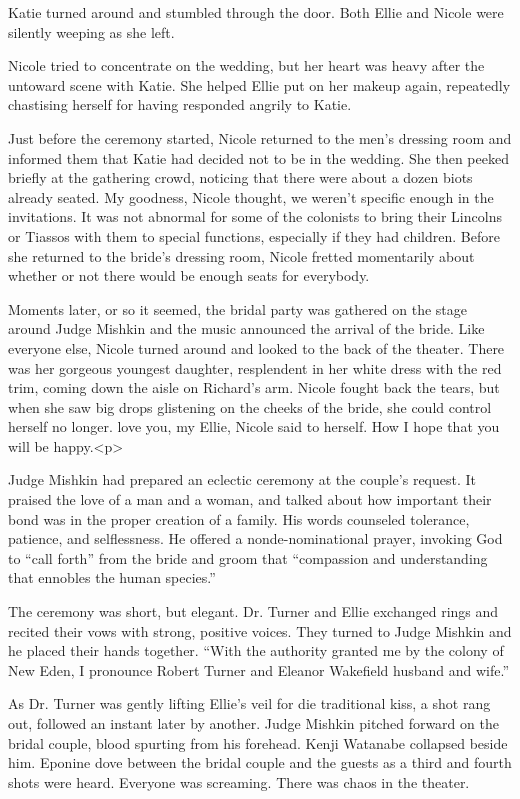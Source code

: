 \documentclass[]{article}
\begin{document}
{Katie turned around and stumbled through the door. Both Ellie and Nicole were silently weeping as she left.

Nicole tried to concentrate on the wedding, but her heart was heavy after the untoward scene with Katie. She helped Ellie put on her makeup again, repeatedly chastising herself for having responded angrily to Katie.

Just before the ceremony started, Nicole returned to the men’s dressing room and informed them that Katie had decided not to be in the wedding. She then peeked briefly at the gathering crowd, noticing that there were about a dozen biots already seated. My goodness, Nicole thought, we weren’t specific enough in the invitations. It was not abnormal for some of the colonists to bring their Lincolns or Tiassos with them to special functions, especially if they had children. Before she returned to the bride’s dressing room, Nicole fretted momentarily about whether or not there would be enough seats for everybody.

Moments later, or so it seemed, the bridal party was gathered on the stage around Judge Mishkin and the music announced the arrival of the bride. Like everyone else, Nicole turned around and looked to the back of the theater. There was her gorgeous youngest daughter, resplendent in her white dress with the red trim, coming down the aisle on Richard’s arm. Nicole fought back the tears, but when she saw big drops glistening on the cheeks of the bride, she could control herself no longer. love you, my Ellie, Nicole said to herself. How I hope that you will be happy.<p>

Judge Mishkin had prepared an eclectic ceremony at the couple’s request. It praised the love of a man and a woman, and talked about how important their bond was in the proper creation of a family. His words counseled tolerance, patience, and selflessness. He offered a nonde-nominational prayer, invoking God to “call forth” from the bride and groom that “compassion and understanding that ennobles the human species.”

The ceremony was short, but elegant. Dr. Turner and Ellie exchanged rings and recited their vows with strong, positive voices. They turned to Judge Mishkin and he placed their hands together. “With the authority granted me by the colony of New Eden, I pronounce Robert Turner and Eleanor Wakefield husband and wife.”

As Dr. Turner was gently lifting Ellie’s veil for die traditional kiss, a shot rang out, followed an instant later by another. Judge Mishkin pitched forward on the bridal couple, blood spurting from his forehead. Kenji Watanabe collapsed beside him. Eponine dove between the bridal couple and the guests as a third and fourth shots were heard. Everyone was screaming. There was chaos in the theater.

}
\end{document}
